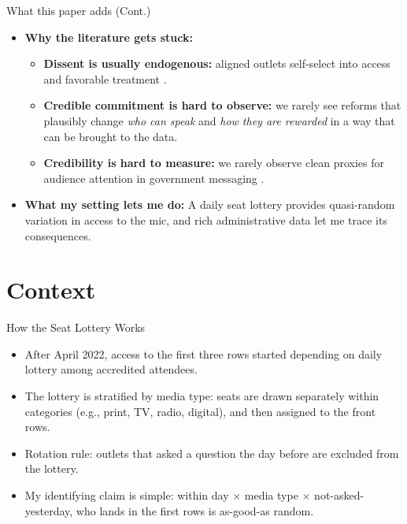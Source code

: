 \documentclass[10pt,aspectratio=169]{beamer}
\begin{document}
\begin{frame}{What this paper adds (Cont.)}
\begin{itemize}\setlength\itemsep{0.85em}

\item \textbf{Why the literature gets stuck:}
  \begin{itemize}\setlength\itemsep{0.25em}
    \item \textbf{Dissent is usually endogenous:} aligned outlets self-select into access and favorable treatment
    {\footnotesize\color{gray}\citep{ArgCorr-DiTella-AEJAE}}.
    \item \textbf{Credible commitment is hard to observe:} we rarely see reforms that plausibly change
    \textit{who can speak} and \textit{how they are rewarded} in a way that can be brought to the data.
    \item \textbf{Credibility is hard to measure:} we rarely observe clean proxies for audience attention in government messaging
    {\footnotesize\color{gray}\citep{PersuasionEmpirical-Dellavigna-AR}}.
  \end{itemize}
  
  \item \textbf{What my setting lets me do:}
  A daily seat lottery provides quasi-random variation in \alert{access to the mic},
  and rich administrative data let me trace its consequences.
\end{itemize}
\end{frame}

\section{Context}

\begin{frame}{How the Seat Lottery Works}
\begin{itemize}
  \setlength\itemsep{0.8em}

  \item After April 2022, access to the \alert{first three rows} started depending on \alert{daily lottery} among accredited attendees.

  \item The lottery is \alert{stratified by media type}: seats are drawn separately within categories (e.g., print, TV, radio, digital), and then assigned to the front rows.

  \item Rotation rule: outlets that asked a question the day before are excluded from the lottery.

  \item My identifying claim is simple: \alert{within day $\times$ media type $\times$ not-asked-yesterday}, who lands in the first rows is as-good-as random.
\end{itemize}
\end{frame}
\end{document}
